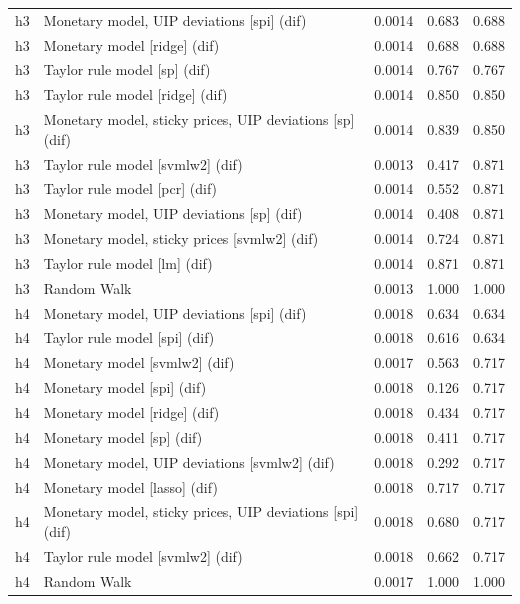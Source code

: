 \begin{ThreePartTable}
\begin{longtable}[t]{cp{5.5cm}ccc}
\addlinespace
h3 & \raggedright Monetary model, UIP deviations [spi] (dif) & 0.0014 & 0.683 & 0.688\\
h3 & \raggedright Monetary model [ridge] (dif) & 0.0014 & 0.688 & 0.688\\
h3 & \raggedright Taylor rule model [sp] (dif) & 0.0014 & 0.767 & 0.767\\
h3 & \raggedright Taylor rule model [ridge] (dif) & 0.0014 & 0.850 & 0.850\\
h3 & \raggedright Monetary model, sticky prices, UIP deviations [sp] (dif) & 0.0014 & 0.839 & 0.850\\
h3 & \raggedright Taylor rule model [svmlw2] (dif) & 0.0013 & 0.417 & 0.871\\
h3 & \raggedright Taylor rule model [pcr] (dif) & 0.0014 & 0.552 & 0.871\\
h3 & \raggedright Monetary model, UIP deviations [sp] (dif) & 0.0014 & 0.408 & 0.871\\
h3 & \raggedright Monetary model, sticky prices [svmlw2] (dif) & 0.0014 & 0.724 & 0.871\\
h3 & \raggedright Taylor rule model [lm] (dif) & 0.0014 & 0.871 & 0.871\\
h3 & \raggedright Random Walk & 0.0013 & 1.000 & 1.000\\
\addlinespace
h4 & \raggedright Monetary model, UIP deviations [spi] (dif) & 0.0018 & 0.634 & 0.634\\
h4 & \raggedright Taylor rule model [spi] (dif) & 0.0018 & 0.616 & 0.634\\
h4 & \raggedright Monetary model [svmlw2] (dif) & 0.0017 & 0.563 & 0.717\\
h4 & \raggedright Monetary model [spi] (dif) & 0.0018 & 0.126 & 0.717\\
h4 & \raggedright Monetary model [ridge] (dif) & 0.0018 & 0.434 & 0.717\\
h4 & \raggedright Monetary model [sp] (dif) & 0.0018 & 0.411 & 0.717\\
h4 & \raggedright Monetary model, UIP deviations [svmlw2] (dif) & 0.0018 & 0.292 & 0.717\\
h4 & \raggedright Monetary model [lasso] (dif) & 0.0018 & 0.717 & 0.717\\
h4 & \raggedright Monetary model, sticky prices, UIP deviations [spi] (dif) & 0.0018 & 0.680 & 0.717\\
h4 & \raggedright Taylor rule model [svmlw2] (dif) & 0.0018 & 0.662 & 0.717\\
h4 & \raggedright Random Walk & 0.0017 & 1.000 & 1.000\\

\end{longtable}
\end{ThreePartTable}
